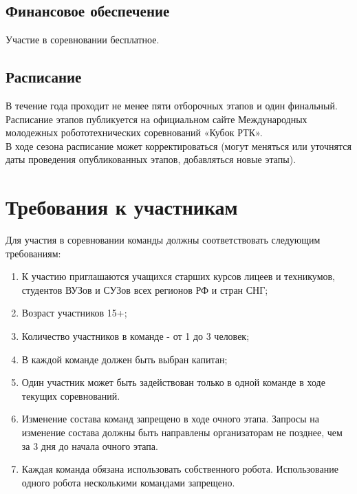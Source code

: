 \documentclass[12pt]{article}
\begin{document}
\subsection{Финансовое обеспечение} \hspace*{1cm}
Участие в соревновании бесплатное.

\subsection{Расписание}\hspace*{1cm}
В течение года проходит не менее пяти отборочных этапов и один финальный. Расписание этапов публикуется на официальном сайте Международных молодежных робототехнических соревнований «Кубок РТК».
\\\hspace*{1cm} В ходе сезона расписание может корректироваться (могут меняться или уточнятся даты проведения опубликованных этапов, добавляться новые этапы). 

\section{Требования к участникам} \hspace*{1cm}
Для участия в соревновании команды должны соответствовать следующим требованиям:
\begin{enumerate}[\textbullet]
	\item К участию приглашаются учащихся старших курсов лицеев и техникумов, студентов ВУЗов и СУЗов всех регионов РФ и стран СНГ;
	\item Возраст участников 15+;
	\item Количество участников в команде - от 1 до 3 человек;
	\item В каждой команде должен быть выбран капитан;
    \item Один участник может быть задействован только в одной команде в ходе текущих соревнований.
    \item Изменение состава команд запрещено в ходе очного этапа.  Запросы на изменение состава должны быть направлены организаторам не позднее, чем за 3 дня до начала очного этапа. 
    \item Каждая команда обязана использовать собственного робота.  Использование одного робота несколькими командами запрещено.
\end{enumerate}

\end{document}
